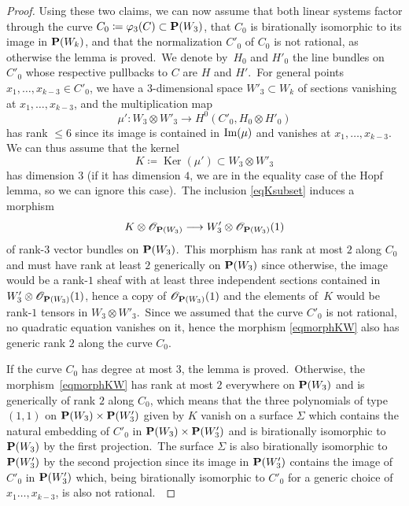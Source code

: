 \documentclass[12pt]{amsart}
\def\cO{\mathscr{O}}
\def\P{{\bf P}}
\def\phi{\varphi}
\def\Im{\mathop{\rm Im}\nolimits}
\DeclareMathOperator{\Ker}{Ker}
\def\lra{\longrightarrow}
\theoremstyle{remark}
\begin{document}
\begin{proof}
Using these two claims, we can now assume that both linear systems factor through  the curve $C_0\coloneqq\phi_3(C)\subset \P(W_3)$,  that $C_0$ is birationally isomorphic to its image in $\P(W_k)$, and that  the normalization  $C'_0$ of $C_0$ is not rational, as otherwise the lemma is proved.\ We  denote by~$H_0$ and $H'_0$ the line bundles on  $C'_0$  whose respective pullbacks to $C$ are $H$ and $H'$.\      For    general points $x_1,\ldots,x_{k-3}\in C'_0$, we have a
$3$-dimensional space $W'_3
\subset W_k$ of sections vanishing at $x_1,\ldots,x_{k-3}$, and the multiplication map
$$\mu'\colon  W_3\otimes W'_3\lra H^0(C'_0, H_0\otimes H'_0)$$
has rank $\leq 6$ since its image is contained in $ \Im (\mu)$ and vanishes at $x_1,\dots,x_{k-3}$.
We can thus assume that the kernel
\begin{equation}
\label{eqKsubset}
K\coloneqq  \Ker (\mu')\subset  W_3\otimes W'_3
\end{equation}
has dimension $3$ (if it has dimension $4$,   we are in the equality case of the Hopf lemma, so we can ignore this case).\
The inclusion \eqref{eqKsubset} induces a morphism
\begin{equation}
\label{eqmorphKW}
K\otimes \cO_{\P(  W_3)}\lra  W'_3\otimes  \cO_{\P(  W_3)}(1)
\end{equation}
of rank-$3$ vector bundles
on $\P(W_3)$.\ This morphism  has rank at most $ 2$ along $C_0$ and   must have rank at least $2$ generically on $\P(W_3)$ since otherwise, the image would be  a rank-$1$ sheaf with at least three independent sections contained in $W'_3\otimes  \cO_{\P(  W_3)}(1)$, hence a copy of  $\cO_{\P(  W_3)}(1)$ and the elements of~$K$ would be rank-$1$ tensors in $W_3\otimes W'_3$.\   Since we assumed that the curve $C'_0$ is not rational, no quadratic equation vanishes on it, hence  the morphism \eqref{eqmorphKW} also has generic rank $2$ along the curve $C_0$.

If the curve  $C_0$ has degree at most $ 3$,  the lemma is proved.\ Otherwise, the morphism~\eqref{eqmorphKW}  has   rank at most $ 2$ everywhere on $\P(  W_3)$ and is generically of rank $2$ along $C_0$, which means that the three polynomials of type $(1,1)$ on $\P( W_3)\times \P(  W'_3)$ given by $K$ vanish on  a surface $\Sigma$ which contains the natural  embedding of $C'_0$ in $\P( W_3)\times \P(  W'_3)$ and is birationally isomorphic to  $\P(  W_3)$ by the first projection.\ The surface $\Sigma$  is  also birationally isomorphic  to  $\P( W'_3)$ by the second projection since its image in $\P( W'_3)$ contains the image of $C'_0$ in $\P( W'_3)$ which, being birationally isomorphic to $C'_0$ for a generic choice of $x_1\ldots,x_{k-3}$, is also not rational.\


\end{proof}
\end{document}
